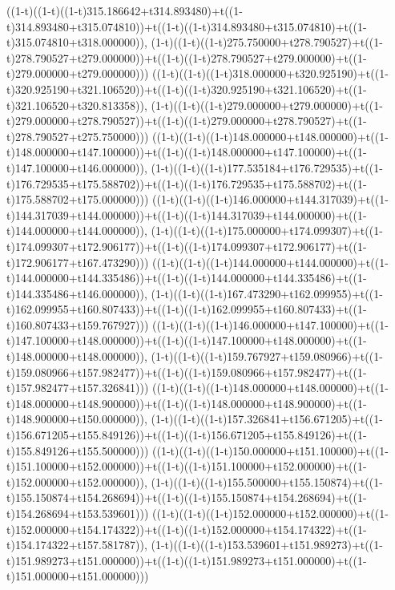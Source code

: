 ((1-t)((1-t)((1-t)315.186642+t314.893480)+t((1-t)314.893480+t315.074810))+t((1-t)((1-t)314.893480+t315.074810)+t((1-t)315.074810+t318.000000)),                                     (1-t)((1-t)((1-t)275.750000+t278.790527)+t((1-t)278.790527+t279.000000))+t((1-t)((1-t)278.790527+t279.000000)+t((1-t)279.000000+t279.000000)))
((1-t)((1-t)((1-t)318.000000+t320.925190)+t((1-t)320.925190+t321.106520))+t((1-t)((1-t)320.925190+t321.106520)+t((1-t)321.106520+t320.813358)),                                     (1-t)((1-t)((1-t)279.000000+t279.000000)+t((1-t)279.000000+t278.790527))+t((1-t)((1-t)279.000000+t278.790527)+t((1-t)278.790527+t275.750000)))
((1-t)((1-t)((1-t)148.000000+t148.000000)+t((1-t)148.000000+t147.100000))+t((1-t)((1-t)148.000000+t147.100000)+t((1-t)147.100000+t146.000000)),                                     (1-t)((1-t)((1-t)177.535184+t176.729535)+t((1-t)176.729535+t175.588702))+t((1-t)((1-t)176.729535+t175.588702)+t((1-t)175.588702+t175.000000)))
((1-t)((1-t)((1-t)146.000000+t144.317039)+t((1-t)144.317039+t144.000000))+t((1-t)((1-t)144.317039+t144.000000)+t((1-t)144.000000+t144.000000)),                                     (1-t)((1-t)((1-t)175.000000+t174.099307)+t((1-t)174.099307+t172.906177))+t((1-t)((1-t)174.099307+t172.906177)+t((1-t)172.906177+t167.473290)))
((1-t)((1-t)((1-t)144.000000+t144.000000)+t((1-t)144.000000+t144.335486))+t((1-t)((1-t)144.000000+t144.335486)+t((1-t)144.335486+t146.000000)),                                     (1-t)((1-t)((1-t)167.473290+t162.099955)+t((1-t)162.099955+t160.807433))+t((1-t)((1-t)162.099955+t160.807433)+t((1-t)160.807433+t159.767927)))
((1-t)((1-t)((1-t)146.000000+t147.100000)+t((1-t)147.100000+t148.000000))+t((1-t)((1-t)147.100000+t148.000000)+t((1-t)148.000000+t148.000000)),                                     (1-t)((1-t)((1-t)159.767927+t159.080966)+t((1-t)159.080966+t157.982477))+t((1-t)((1-t)159.080966+t157.982477)+t((1-t)157.982477+t157.326841)))
((1-t)((1-t)((1-t)148.000000+t148.000000)+t((1-t)148.000000+t148.900000))+t((1-t)((1-t)148.000000+t148.900000)+t((1-t)148.900000+t150.000000)),                                     (1-t)((1-t)((1-t)157.326841+t156.671205)+t((1-t)156.671205+t155.849126))+t((1-t)((1-t)156.671205+t155.849126)+t((1-t)155.849126+t155.500000)))
((1-t)((1-t)((1-t)150.000000+t151.100000)+t((1-t)151.100000+t152.000000))+t((1-t)((1-t)151.100000+t152.000000)+t((1-t)152.000000+t152.000000)),                                     (1-t)((1-t)((1-t)155.500000+t155.150874)+t((1-t)155.150874+t154.268694))+t((1-t)((1-t)155.150874+t154.268694)+t((1-t)154.268694+t153.539601)))
((1-t)((1-t)((1-t)152.000000+t152.000000)+t((1-t)152.000000+t154.174322))+t((1-t)((1-t)152.000000+t154.174322)+t((1-t)154.174322+t157.581787)),                                     (1-t)((1-t)((1-t)153.539601+t151.989273)+t((1-t)151.989273+t151.000000))+t((1-t)((1-t)151.989273+t151.000000)+t((1-t)151.000000+t151.000000)))

